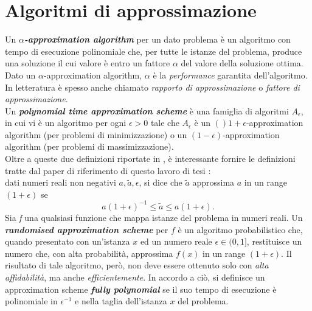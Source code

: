 \section{Algoritmi di approssimazione}\label{sec:approxalgo}
Un \textit{\textbf{$\alpha$-approximation algorithm}} per un dato problema è un algoritmo con tempo di esecuzione polinomiale che, per tutte le istanze del problema, produce una soluzione il cui valore è entro un fattore $\alpha$ del valore della soluzione ottima.\\
Dato un $\alpha$-approximation algorithm, $\alpha$ è la \textit{performance} garantita dell'algoritmo. In letteratura è spesso anche chiamato \textit{rapporto di approssimazione} o \textit{fattore di approssimazione}.\\
Un \textit{\textbf{polynomial time approximation scheme}} è una famiglia di algoritmi ${A_\epsilon}$, in cui vi è un algoritmo per ogni $\epsilon > 0$ tale che $A_\epsilon$ è un $()1+\epsilon$-approximation algorithm (per problemi di minimizzazione) o un $(1-\epsilon)$-approximation algorithm (per problemi di massimizzazione).\\
Oltre a queste due definizioni riportate in \cite{williamson2011design}, è interessante fornire le definizioni tratte dal paper di riferimento di questo lavoro di tesi \cite{jerrum1993polynomial}:\\
dati numeri reali non negativi $a, \tilde{a}, \epsilon$, si dice che $\tilde{a}$ approssima $a$ in un range $(1+\epsilon)$ se
\begin{equation}
	a(1+\epsilon)^{-1} \leq \tilde{a} \leq a(1+\epsilon).
\end{equation}
Sia \textit{f} una qualsiasi funzione che mappa istanze del problema in numeri reali. Un \textit{\textbf{randomised approximation scheme}} per $f$ è un algoritmo probabilistico che, quando presentato con un'istanza $x$ ed un numero reale $\epsilon \in (0,1]$, restituisce un numero che, con alta probabilità, approssima $f(x)$ in un range $(1+\epsilon)$. Il risultato di tale algoritmo, però, non deve essere ottenuto solo con \textit{alta affidabilità}, ma anche \textit{efficientemente}. In accordo a ciò, si definisce un approximation scheme \textit{\textbf{fully polynomial}} se il suo tempo di esecuzione è polinomiale in $\epsilon^{-1}$ e nella taglia dell'istanza $x$ del problema.